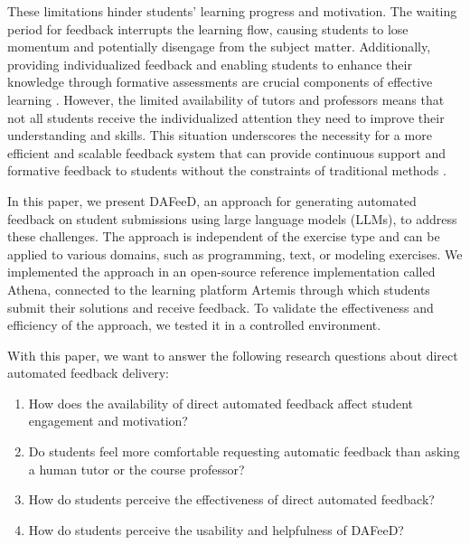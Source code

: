 \documentclass[manuscript,screen,review]{acmart}
\begin{document}
These limitations hinder students' learning progress and motivation. 
The waiting period for feedback interrupts the learning flow, causing students to lose momentum and potentially disengage from the subject matter.
Additionally, providing individualized feedback and enabling students to enhance their knowledge through formative assessments are crucial components of effective learning \cite{irons:2007:EnhancingLearningFormative,higgins:2002:ConscientiousConsumerReconsidering}.
However, the limited availability of tutors and professors means that not all students receive the individualized attention they need to improve their understanding and skills.
This situation underscores the necessity for a more efficient and scalable feedback system that can provide continuous support and formative feedback to students without the constraints of traditional methods \cite{sondergaard:2004:EffectiveFeedbackSmall}.


In this paper, we present DAFeeD, an approach for generating automated feedback on student submissions using large language models (LLMs), to address these challenges.
The approach is independent of the exercise type and can be applied to various domains, such as programming, text, or modeling exercises.
We implemented the approach in an open-source reference implementation called Athena, connected to the learning platform Artemis through which students submit their solutions and receive feedback.
To validate the effectiveness and efficiency of the approach, we tested it in a controlled environment. 

With this paper, we want to answer the following research questions about direct automated feedback delivery:

\begin{enumerate}[label=\textbf{RQ\arabic*},ref=RQ\arabic*]
  \item \label{RQ1} How does the availability of direct automated feedback affect student engagement and motivation? 
  \item \label{RQ2} Do students feel more comfortable requesting automatic feedback than asking a human tutor or the course professor?
  \item \label{RQ3} How do students perceive the effectiveness of direct automated feedback?
  \item \label{RQ4} How do students perceive the usability and helpfulness of DAFeeD?
\end{enumerate}
\end{document}
